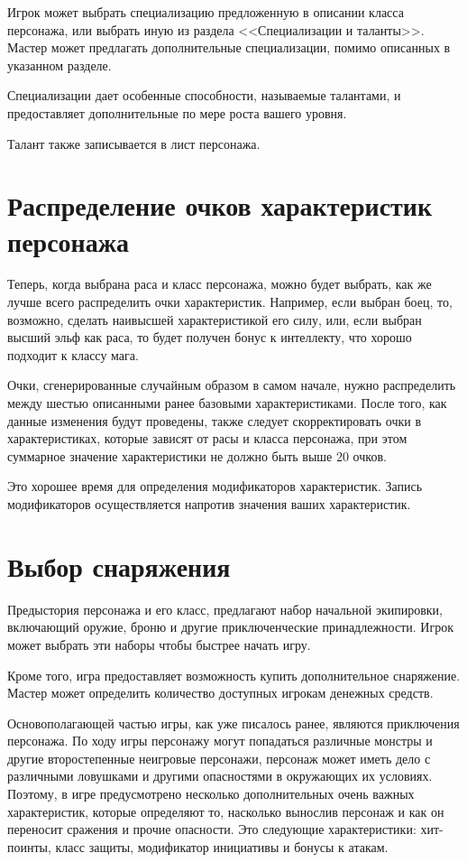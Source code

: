 Игрок может выбрать специализацию предложенную в описании класса персонажа, или выбрать иную из раздела <<Специализации и таланты>>. Мастер может предлагать дополнительные специализации, помимо описанных в указанном разделе.

Специализации дает особенные способности, называемые талантами, и предоставляет дополнительные по мере роста вашего уровня.

Талант также записывается в лист персонажа.

\section{Распределение очков характеристик персонажа}

Теперь, когда выбрана раса и класс персонажа, можно будет выбрать, как же лучше всего распределить очки характеристик. Например, если выбран боец, то, возможно, сделать наивысшей характеристикой его силу, или, если выбран высший эльф как раса, то будет получен бонус к интеллекту, что хорошо подходит к классу мага.

Очки, сгенерированные случайным образом в самом начале, нужно распределить между шестью описанными ранее базовыми характеристиками. После того, как данные изменения будут проведены, также следует скорректировать очки в характеристиках, которые зависят от расы и класса персонажа, при этом суммарное значение характеристики не должно быть выше 20 очков.

Это хорошее время для определения модификаторов характеристик. Запись модификаторов осуществляется напротив значения ваших характеристик.

\section{Выбор снаряжения}

Предыстория персонажа и его класс, предлагают набор начальной экипировки, включающий оружие, броню и другие приключенческие принадлежности. Игрок может выбрать эти наборы чтобы быстрее начать игру.

Кроме того, игра предоставляет возможность купить дополнительное снаряжение. Мастер может определить количество доступных игрокам денежных средств.

Основополагающей частью игры, как уже писалось ранее, являются приключения персонажа. По ходу игры персонажу могут попадаться различные монстры и другие второстепенные неигровые персонажи, персонаж может иметь дело с различными ловушками и другими опасностями в окружающих их условиях. Поэтому, в игре предусмотрено несколько дополнительных очень важных характеристик, которые определяют то, насколько вынослив персонаж и как он переносит сражения и прочие опасности. Это следующие характеристики:  хит-поинты, класс защиты, модификатор инициативы и бонусы к атакам.

